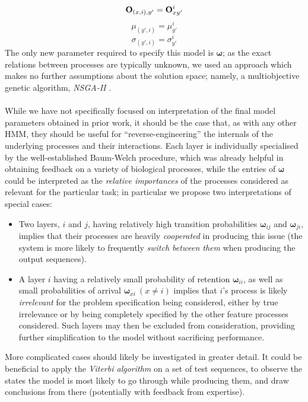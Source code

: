 \documentclass[12pt,openany]{article}
\begin{document}
\begin{equation}
	{\bf O}_{(x, i), y'} = 	{\bf O}_{xy'}^i
	\end{equation}
\begin{equation}
	\mu_{(y', i)} = \mu_{y'}^i
	\end{equation}
\begin{equation}
	\sigma_{(y', i)} = \sigma_{y'}^i
	\end{equation}
	The only new parameter required to specify this model is $\boldsymbol\omega$; as the exact relations between processes are typically unknown, we used an approach which makes no further assumptions about the solution space; namely, a multiobjective genetic algorithm, \emph{NSGA-II} \cite{Deb02}.\\ \\
	While we have not specifically focused on interpretation of the final model parameters obtained in prior work, it should be the case that, as with any other HMM, they should be useful for ``reverse-engineering'' the internals of the underlying processes and their interactions. Each layer is individually specialised by the well-established Baum-Welch procedure, which was already helpful in obtaining feedback on a variety of biological processes, while the entries of $\boldsymbol\omega$ could be interpreted as the \emph{relative importances} of the processes considered as relevant for the particular task; in particular we propose two interpretations of special cases:
	\begin{itemize}
		\item Two layers, $i$ and $j$, having relatively high transition probabilities ${\boldsymbol\omega}_{ij}$ and ${\boldsymbol\omega}_{ji}$, implies that their processes are heavily \emph{cooperated} in producing this issue (the system is more likely to frequently \emph{switch between them} when producing the output sequences).
		\item A layer $i$ having a relatively small probability of retention ${\boldsymbol\omega}_{ii}$, as well as small probabilities of arrival ${\boldsymbol\omega}_{xi}\ (x \neq i)$ implies that $i$'s process is likely \emph{irrelevant} for the problem specification being considered, either by true irrelevance or by being completely specified by the other feature processes considered. Such layers may then be excluded from consideration, providing further simplification to the model without sacrificing performance.
	\end{itemize}
	More complicated cases should likely be investigated in greater detail. It could be beneficial to apply the \emph{Viterbi algorithm} on a set of test sequences, to observe the states the model is most likely to go through while producing them, and draw conclusions from there (potentially with feedback from expertise).
	
\end{document}
